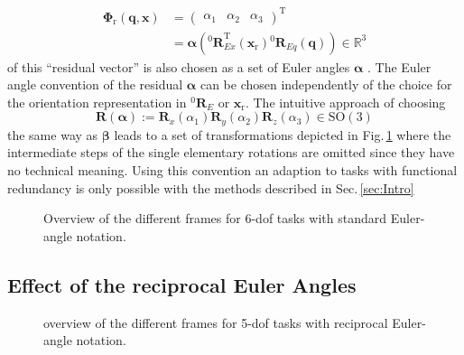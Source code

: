 \documentclass[twocolumn,10pt]{IFTOMM}
\newcommand{\bm}[1]{\boldsymbol{#1}}
\newcommand{\vek}[3]{\boldsymbol{#1}^{#2}_{#3}}
\newcommand{\rotmat}[2]{{{ }^{#1}\boldsymbol{R}}_{#2}}
\newcommand{\transp}[0]{{\mathrm{T}}}
\begin{document}
%
\begin{align}
\bm{\Phi}_{\mathrm{r}}(\bm{q},\bm{x}) &= \begin{pmatrix}
\alpha_1  & \alpha_2 & \alpha_3
\end{pmatrix}^\transp  \nonumber \\
&=\bm{\alpha}\left(\rotmat{0}{Ex}^\transp (\bm{x}_{\mathrm{r}})\rotmat{0}{Eq}(\bm{q})\right) \in {\mathbb{R}}^{3}
\label{equ:Phir_def}
\end{align}
%
of this ``residual vector'' is also chosen as a set of Euler angles $\bm{\alpha}$ \cite{GoldenbergBenFen1985}.
The Euler angle convention of the residual $\bm{\alpha}$ can be chosen independently of the choice for the orientation representation in $\rotmat{0}{E}$ or $\bm{x}_{\mathrm{r}}$.
The intuitive approach of choosing
%
\begin{equation}
\bm{R}(\bm{\alpha}) := \bm{R}_x(\alpha_1) \bm{R}_y(\alpha_2) \bm{R}_z(\alpha_3) \in \mathrm{SO(3)}
\end{equation}
%
the same way as $\bm{\beta}$ leads to a set of transformations depicted in Fig.\,\ref{fig:frames_6dof} where the intermediate steps of the single elementary rotations are omitted since they have no technical meaning.
Using this convention an adaption to tasks with functional redundancy is only possible with the methods described in Sec.\,\ref{sec:Intro}

\begin{figure}[tb!]
    
    \caption{Overview of the different frames for 6-dof tasks with standard Euler-angle notation.}
    \label{fig:frames_6dof}
\end{figure} 

\subsection{Effect of the reciprocal Euler Angles}
\label{sec:RecEulAng_effect}



\begin{figure}[tb!]
    
    \caption{overview of the different frames for 5-dof tasks with reciprocal Euler-angle notation.}
    \label{fig:frames_5dof}
\end{figure} 


\end{document}
